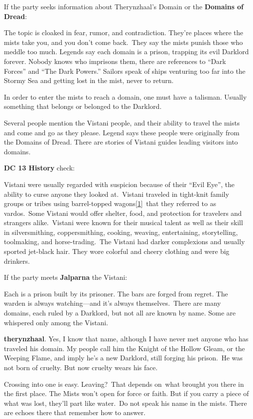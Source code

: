 \documentclass[10pt,twocolumn]{article}
\renewcommand{\textsc}[1]{\XCharterSC#1}
\let\oldtextbf\textbf
\renewcommand{\textbf}[1]{\oldtextbf{{#1}}}
\renewenvironment{quote}
  {%
    \begingroup
      \setlength{\parindent}{1em}%
      \setlength{\parskip}{0pt}%
      \begin{tcolorbox}[myquote,
        before upper={%
          \let\textbf\oldtextbf
          \setlength{\parindent}{1.5em}%
          \setlength{\parskip}{0pt}%
          \noindent              %
        }%
      ]%
  }
  {%
      \end{tcolorbox}%
    \endgroup
  }
\begin{document}
If the party seeks information about Therynzhaal's Domain or the
\textbf{Domains of Dread}:

\begin{quote}
The topic is cloaked in fear, rumor, and contradiction. They're places
where the mists take you, and you don't come back.~They say the mists
punish those who meddle too much. Legends say each domain is a prison,
trapping its evil Darklord forever. Nobody knows who imprisons them,
there are references to ``Dark Forces'' and ``The Dark Powers.'' Sailors
speak of ships venturing too far into the Stormy Sea and getting lost in
the mist, never to return.

In order to enter the mists to reach a domain, one must have a talisman.
Usually something that belongs or belonged to the Darklord.

Several people mention the Vistani people, and their ability to travel
the mists and come and go as they please. Legend says these people were
originally from the Domains of Dread. There are stories of Vistani
guides leading visitors into domains.
\end{quote}

\textbf{DC 13 History} check:

\begin{quote}
Vistani were usually regarded with suspicion because of their ``Evil
Eye'', the ability to curse anyone they looked at.~Vistani traveled in
tight-knit family groups or tribes using barrel-topped
wagons\href{https://forgottenrealms.fandom.com/wiki/Vistani\#cite_note-CoS-p26--1}{{[}1{]}}~that
they referred to as vardos.~Some Vistani would offer shelter, food, and
protection for travelers and strangers alike.~Vistani were known for
their musical talent as well as their skill in silversmithing,
coppersmithing, cooking, weaving, entertaining, storytelling,
toolmaking, and horse-trading.~The Vistani had darker complexions and
usually sported jet-black hair. They wore colorful and cheery clothing
and were big drinkers.
\end{quote}

If the party meets \textbf{Jalparna} the Vistani:

\begin{quote}
Each is a prison built by its prisoner. The bars are forged from regret.
The warden is always watching---and it's always themselves.~There are
many domains, each ruled by a Darklord, but not all are known by name.
Some are whispered only among the Vistani.~

\textcolor{keywordcolor}{\textbf{\textsc{therynzhaal}}}. Yes, I know
that name, although I have never met anyone who has traveled his domain.
My people call him the Knight of the Hollow Gleam, or the Weeping Flame,
and imply he's a new Darklord, still forging his prison.~He was not born
of cruelty. But now cruelty wears his face.

Crossing into one is easy. Leaving?~That depends on~what brought you
there in the first place. The Mists won't open for force or faith. But
if you carry a piece of what was lost, they'll part like water.~Do not
speak his name in the mists. There are echoes there that remember how to
answer.
\end{quote}
\end{document}
